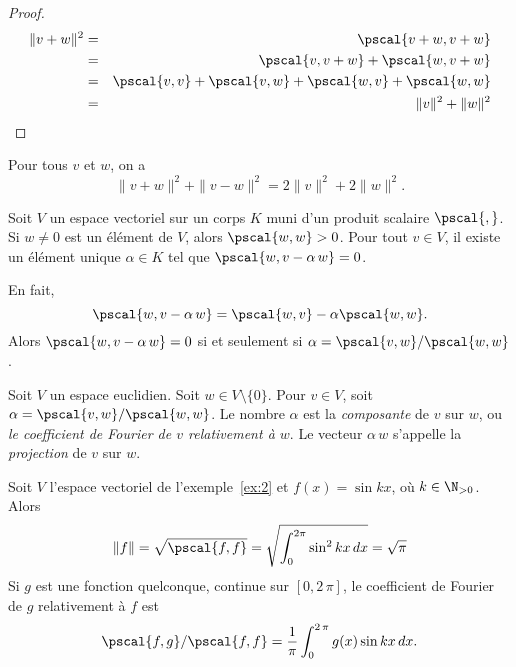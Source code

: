 \begin{proof}
  \begin{eqnarray*}
     \|v+w\|^2 &= & \pscal{v+w,v+w} \\
               & = & \pscal{v,v+w} + \pscal{w,v+w} \\
               & = & \pscal{v,v} + \pscal{v,w} + \pscal{w,v} + \pscal{w,w} \\
               & = & \|v\|^2 + \|w\|^2
  \end{eqnarray*}
\end{proof}

\begin{proposition} Pour tous $v$ et $w$, on a 
  \begin{displaymath}
    \|v+w\|^2 + \|v-w\|^2 = 2 \|v\|^2 + 2 \|w\|^2.  
  \end{displaymath}  
\end{proposition}



Soit $V$ un espace vectoriel sur un corps $K$ muni d'un produit scalaire  $\pscal{,}$. 
Si $w ≠ 0$ est un élément de $V$, alors  $\pscal{w,w} >0$. Pour  tout $v \in V$, il existe un élément unique $\alpha \in K$ tel que $\pscal{w,v -\alpha\, w} = 0$. 

En fait,
\begin{displaymath}
  \pscal{w,v -\alpha\, w} = \pscal{w,v} - \alpha \pscal{w,w}. 
\end{displaymath}
Alors $\pscal{w,v -\alpha\, w} = 0$ si et seulement si $\alpha = \pscal{v,w} / \pscal{w,w}$. 


\begin{definition}
  \label{def:6}
  Soit $V$ un espace euclidien. 
  Soit $w \in V \setminus \{0\}$. Pour $v \in V$, soit $\alpha = \pscal{v,w} / \pscal{w,w}$.  Le nombre $\alpha$ est la \emph{composante} de $v$ sur $w$, ou \emph{le coefficient de Fourier de $v$ relativement à $w$}. Le vecteur $\alpha \, w$ s'appelle la \emph{projection} de $v$ sur $w$. 
\end{definition}


\begin{example}
  \label{exe:5}
  Soit $V$ l'espace vectoriel de l'exemple~\ref{ex:2} et $f(x) = \sin kx$, où $k \in \N_{>0}$. Alors
  \begin{displaymath}
   \|f\| = \sqrt{\pscal{f,f}} =  \sqrt{\int_0^{2\pi} \sin^2 kx \, dx} = \sqrt{\pi}
  \end{displaymath}
Si $g$ est une fonction quelconque, continue sur $[0,2\,\pi]$, le coefficient de Fourier de $g$ relativement à $f$ est 
\begin{displaymath}
  \pscal{f,g} /   \pscal{f,f}  = \frac{1}{\pi} \int_0^{2\, \pi} g(x) \sin kx \,dx. 
\end{displaymath}
\end{example}



